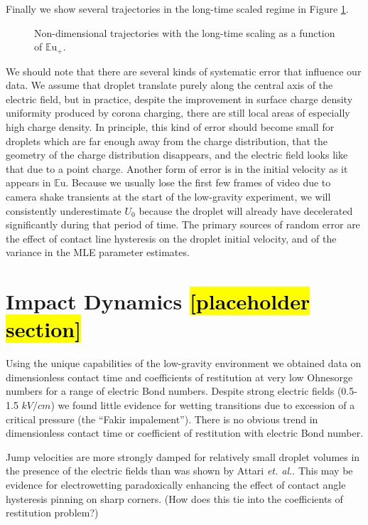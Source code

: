\documentclass[12pt,a4paper,oneside]{book}
\begin{document}
Finally we show several trajectories in the long-time scaled regime in Figure \ref{fig:series_l_ds}.
\begin{figure}[htb]
    \centering
    
    \caption{Non-dimensional trajectories with the long-time scaling as a function of ${\mathbb{E}\mbox{u}}_+$.\label{fig:series_l_ds}}
\end{figure}
We should note that there are several kinds of systematic error that influence our data. We assume that droplet translate purely along the central axis of the electric field, but in practice, despite the improvement in surface charge density uniformity produced by corona charging, there are still local areas of especially high charge density. In principle, this kind of error should become small for droplets which are far enough away from the charge distribution, that the geometry of the charge distribution disappears, and the electric field looks like that due to a point charge. Another form of error is in the initial velocity as it appears in $\mathbb{E}\mbox{u}$. Because we usually lose the first few frames of video due to camera shake transients at the start of the low-gravity experiment, we will consistently underestimate $U_0$ because the droplet will already have decelerated significantly during that period of time. The primary sources of random error are the effect of contact line hysteresis on the droplet initial velocity, and of the variance in the MLE parameter estimates.
\newpage

\section{Impact Dynamics \hl{[placeholder section]}}
Using the unique capabilities of the low-gravity environment we obtained data on dimensionless contact time and coefficients of restitution at very low Ohnesorge numbers for a range of electric Bond numbers. Despite strong electric fields (0.5-1.5 $kV/cm$) we found little evidence for wetting transitions due to excession of a critical pressure (the ``Fakir impalement''). There is no obvious trend in dimensionless contact time or coefficient of restitution with electric Bond number.

Jump velocities are more strongly damped for relatively small droplet volumes in the presence of the electric fields than was shown by Attari \emph{et. al.}. This may be evidence for electrowetting paradoxically enhancing the effect of contact angle hysteresis pinning on sharp corners. (How does this tie into the coefficients of restitution problem?)
\end{document}
